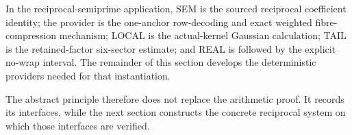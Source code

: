 In the reciprocal-semiprime application, SEM is the sourced reciprocal coefficient identity; the provider is the one-anchor row-decoding and exact weighted fibre-compression mechanism; LOCAL is the actual-kernel Gaussian calculation; TAIL is the retained-factor six-sector estimate; and REAL is followed by the explicit no-wrap interval.  The remainder of this section develops the deterministic providers needed for that instantiation.


The abstract principle therefore does not replace the arithmetic proof.  It records its interfaces, while the next section constructs the concrete reciprocal system on which those interfaces are verified.

